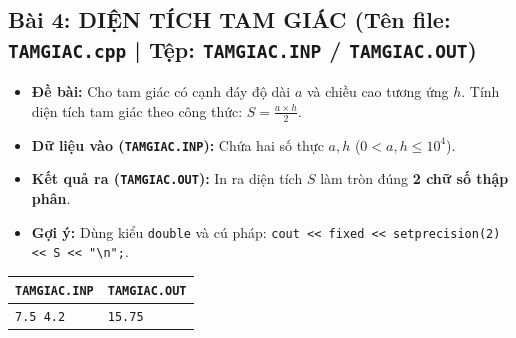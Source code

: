 \documentclass[11pt,a4paper]{article}
\begin{document}
\subsection*{\color{AsianDarkBlue}\small Bài 4: DIỆN TÍCH TAM GIÁC (Tên file: \texttt{TAMGIAC.cpp} | Tệp: \texttt{TAMGIAC.INP} / \texttt{TAMGIAC.OUT})}
\begin{itemize}
    \setlength{\itemsep}{0.5pt}
    \footnotesize
    \item \textbf{Đề bài:} Cho tam giác có cạnh đáy độ dài $a$ và chiều cao tương ứng $h$. Tính diện tích tam giác theo công thức: $S = \frac{a \times h}{2}$.
    \item \textbf{Dữ liệu vào (\texttt{TAMGIAC.INP}):} Chứa hai số thực $a, h$ ($0 < a, h \le 10^4$).
    \item \textbf{Kết quả ra (\texttt{TAMGIAC.OUT}):} In ra diện tích $S$ làm tròn đúng \textbf{2 chữ số thập phân}.
    \item \textbf{Gợi ý:} Dùng kiểu \texttt{double} và cú pháp: \texttt{cout << fixed << setprecision(2) << S << "\textbackslash n";}.
\end{itemize}
\vspace{-2mm}
\begin{center}
\footnotesize
\begin{tabular}{|p{7.8cm}|p{7.8cm}|}
\hline
\textbf{\texttt{TAMGIAC.INP}} & \textbf{\texttt{TAMGIAC.OUT}} \\
\hline
\texttt{7.5 4.2} & \texttt{15.75} \\
\hline
\end{tabular}
\end{center}

\vspace{-2mm}
\end{document}
